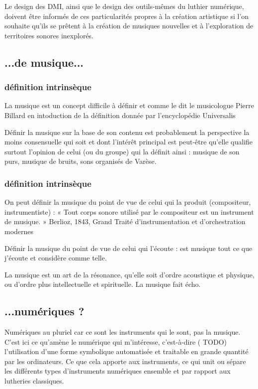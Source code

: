 
%
Le design des DMI, ainsi que le design des outils-mêmes du luthier numérique, doivent être informés de ces particularités propres à la création artistique si l'on souhaite qu'ils se prêtent à la création de musiques nouvelles et à l'exploration de territoires sonores inexplorés.


\subsection*{...de musique...} 
\subsubsection*{définition intrinsèque}
La musique est un concept difficile à définir et comme le dit le musicologue Pierre Billard en intoduction de la définition donnée par l'encyclopédie Universalis 

Définir la musique sur la base de son contenu est probablement la perspective la moins consensuelle qui soit et dont l'intérêt principal est peut-être qu'elle qualifie surtout l'opinion de celui (ou du groupe) qui la définit ainsi : musique de son purs, musique de bruits, sons organisés de Varèse.
\subsubsection*{définition intrinsèque}

On peut définir la musique du point de vue de celui qui la produit (compositeur, instrumentiste) : « Tout corps sonore utilisé par le compositeur est un instrument de musique. » Berlioz, 1843, Grand Traité d'instrumentation et d'orchestration modernes

Définir la musique du point de vue de celui qui l'écoute : est musique tout ce que j'écoute et considère comme telle.

La musique est un art de la résonance, qu'elle soit d'ordre acoustique et physique, ou d'ordre plus intellectuelle et spirituelle. La musique fait écho.

\subsection*{...numériques ?} 
Numériques au pluriel car ce sont les instruments qui le sont, pas la musique.
C'est ici ce qu'amène le numérique qui m'intéresse, c'est-à-dire ( TODO) l'utilisation d'une forme symbolique automatisée et traitable en grande quantité par les ordinateurs. Ce que cela apporte aux instruments, ce qui unit ou sépare les différents types d'instruments numériques ensemble et par rapport aux lutheries classiques.


